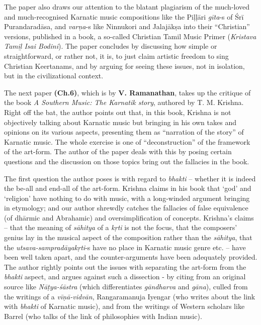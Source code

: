 The paper also draws our attention to the blatant plagiarism of the much-loved and much-recognised Karnatic music compositions like the Piḷḷāri \textit{gīta}-s of Śrī Purandaradāsa, and \textit{varṇa}-s like Ninnukori and Jalajākṣa into their “Christian” versions, published in a book, a so-called Christian Tamil Music Primer (\textit{Kristava Tamiḻ Isai Bodini}). The paper concludes by discussing how simple or straightforward, or rather not, it is, to just claim artistic freedom to sing Christian Keertanams, and by arguing for seeing these issues, not in isolation, but in the civilizational context.

The next paper \textbf{(Ch.6)}, which is by \textbf{V. Ramanathan}, takes up the critique of the book \textit{A Southern Music: The Karnatik story}, authored by T. M. Krishna. Right off the bat, the author points out that, in this book, Krishna is not objectively talking about Karnatic music but bringing in his own takes and opinions on its various aspects, presenting them as “narration of the story” of Karnatic music. The whole exercise is one of “deconstruction” of the framework of the art-form. The author of the paper deals with this by posing certain questions and the discussion on those topics bring out the fallacies in the book.

The first question the author poses is with regard to \textit{bhakti} – whether it is indeed the be-all and end-all of the art-form. Krishna claims in his book that ‘god’ and ‘religion’ have nothing to do with music, with a long-winded argument bringing in etymology; and our author shrewdly catches the fallacies of false equivalence (of dhārmic and Abrahamic) and oversimplification of concepts. Krishna’s claims – that the meaning of \textit{sāhitya} of a \textit{kṛti} is not the focus, that the composers’ genius lay in the musical aspect of the composition rather than the \textit{sāhitya}, that the \textit{utsava-sampradāyakṛti}-s have no place in Karnatic music genre etc. – have been well taken apart, and the counter-arguments have been adequately provided. The author rightly points out the issues with separating the art-form from the \textit{bhakti} aspect, and argues against such a dissection - by citing from an original source like \textit{Nāṭya-śāstra} (which differentiates \textit{gāndharva} and \textit{gāna}), culled from the writings of a \textit{vīṇā-vidvān}, Rangaramanuja Iyengar (who writes about the link with \textit{bhakti} of Karnatic music), and from the writings of Western scholars like Barrel (who talks of the link of philosophies with Indian music).

